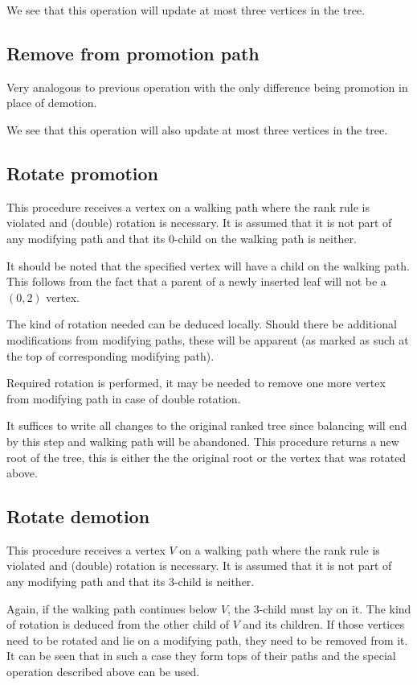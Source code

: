 We see that this operation will update at most three vertices in the tree.

\subsection{Remove from promotion path}

Very analogous to previous operation with the only difference being promotion in place of demotion.

We see that this operation will also update at most three vertices in the tree.

\subsection{Rotate promotion}

This procedure receives a vertex on a walking path where the rank rule is violated and (double) rotation is necessary. It is assumed that it is not part of any modifying path and that its $0$-child on the walking path is neither. 

It should be noted that the specified vertex will have a child on the walking path. This follows from the fact that a parent of a newly inserted leaf will not be a $(0,2)$ vertex.

The kind of rotation needed can be deduced locally. Should there be additional modifications from modifying paths, these will be apparent (as marked as such at the top of corresponding modifying path). 

Required rotation is performed, it may be needed to remove one more vertex from modifying path in case of double rotation.

It suffices to write all changes to the original ranked tree since balancing will end by this step and walking path will be abandoned. 
This procedure returns a new root of the tree, this is either the the original root or the vertex that was rotated above.

\subsection{Rotate demotion}

This procedure receives a vertex $V$ on a walking path where the rank rule is violated and (double) rotation is necessary. It is assumed that it is not part of any modifying path and that its $3$-child is neither. 

Again, if the walking path continues below $V$, the 3-child must lay on it. The kind of rotation is deduced from the other child of $V$ and its children. If those vertices need to be rotated and lie on a modifying path, they need to be removed from it. It can be seen that in such a case they form tops of their paths and the special operation described above can be used.

